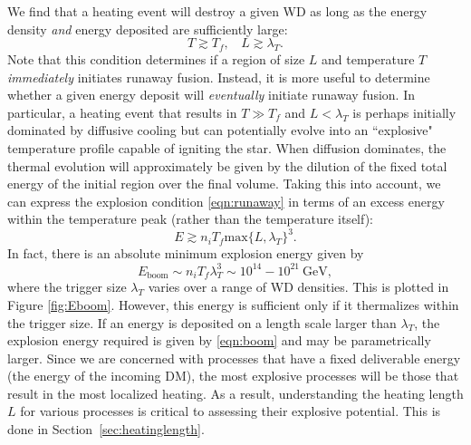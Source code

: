 \documentclass[twocolumn,showpacs,preprintnumbers,amsmath,amssymb,prd]{revtex4}
\newcommand{\GeV}{\text{GeV}}
\begin{document}
We find that a heating event will destroy a given WD as long as the energy density \emph{and} energy deposited are sufficiently large:
\begin{equation}
\label{eqn:runaway}
T \gtrsim T_f, ~~~~ L \gtrsim \lambda_T.
\end{equation}
Note that this condition determines if a region of size $L$ and temperature $T$ \emph{immediately} initiates runaway fusion.  Instead, it is more useful to determine whether a given energy deposit will \emph{eventually} initiate runaway fusion. In particular, a heating event that results in $T \gg T_f$ and $L  < \lambda_T$ is perhaps initially dominated by diffusive cooling but can potentially evolve into an ``explosive" temperature profile capable of igniting the star. When diffusion dominates, the thermal evolution will approximately be given by the dilution of the fixed total energy of the initial region over the final volume. Taking this into account, we can express the explosion condition \eqref{eqn:runaway} in terms of an excess energy within the temperature peak (rather than the temperature itself):
\begin{equation}
\label{eqn:boom}
E \gtrsim n_i T_f \text{max}\{L, \lambda_T\}^3.
\end{equation}
In fact, there is an absolute minimum explosion energy given by
\begin{equation}
E_{\text{boom}} \sim n_i T_f \lambda_T^3 \sim 10^{14} - 10^{21} ~\GeV,
\end{equation}
where the trigger size $\lambda_T$ varies over a range of WD densities. This is plotted in Figure \ref{fig:Eboom}. However, this energy is sufficient only if it thermalizes within the trigger size.  If an energy is deposited on a length scale larger than $\lambda_T$, the explosion energy required is given by \eqref{eqn:boom} and may be parametrically larger. Since we are concerned with processes that have a fixed deliverable energy (the energy of the incoming DM), the most explosive processes will be those that result in the most localized heating. As a result, understanding the heating length $L$ for various processes is critical to assessing their explosive potential. This is done in Section~\ref{sec:heatinglength}.
\end{document}

